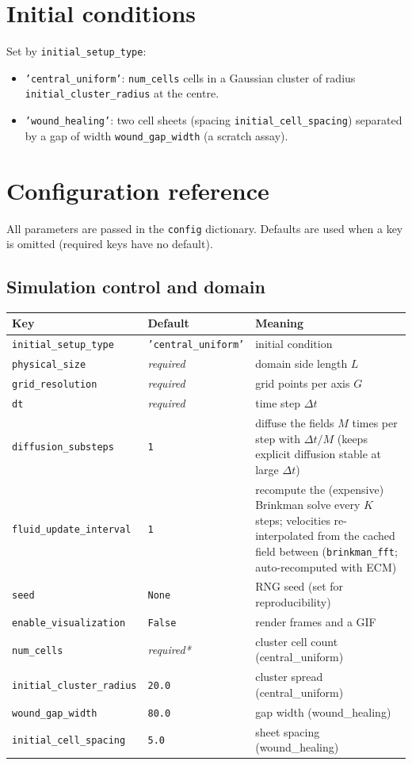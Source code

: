 \documentclass[11pt]{article}
\newcommand{\code}[1]{\texttt{#1}}
\begin{document}
\section{Initial conditions}
Set by \code{initial\_setup\_type}:
\begin{itemize}
  \item \code{'central\_uniform'}: \code{num\_cells} cells in a Gaussian cluster
        of radius \code{initial\_cluster\_radius} at the centre.
  \item \code{'wound\_healing'}: two cell sheets (spacing
        \code{initial\_cell\_spacing}) separated by a gap of width
        \code{wound\_gap\_width} (a scratch assay).
\end{itemize}

\section{Configuration reference}

All parameters are passed in the \code{config} dictionary. Defaults are used when
a key is omitted (required keys have no default).

\subsection{Simulation control and domain}
\begin{longtable}{p{} p{} p{}}
\toprule
Key & Default & Meaning \\ \midrule \endhead
\code{initial\_setup\_type} & \code{'central\_uniform'} & initial condition \\
\code{physical\_size} & \emph{required} & domain side length $L$ \\
\code{grid\_resolution} & \emph{required} & grid points per axis $G$ \\
\code{dt} & \emph{required} & time step $\Delta t$ \\
\code{diffusion\_substeps} & \code{1} & diffuse the fields $M$ times per step with $\Delta t/M$ (keeps explicit diffusion stable at large $\Delta t$) \\
\code{fluid\_update\_interval} & \code{1} & recompute the (expensive) Brinkman solve every $K$ steps; velocities re-interpolated from the cached field between (\code{brinkman\_fft}; auto-recomputed with ECM) \\
\code{seed} & \code{None} & RNG seed (set for reproducibility) \\
\code{enable\_visualization} & \code{False} & render frames and a GIF \\
\code{num\_cells} & \emph{required*} & cluster cell count (central\_uniform) \\
\code{initial\_cluster\_radius} & \code{20.0} & cluster spread (central\_uniform) \\
\code{wound\_gap\_width} & \code{80.0} & gap width (wound\_healing) \\
\code{initial\_cell\_spacing} & \code{5.0} & sheet spacing (wound\_healing) \\
\bottomrule
\end{longtable}
\end{document}
